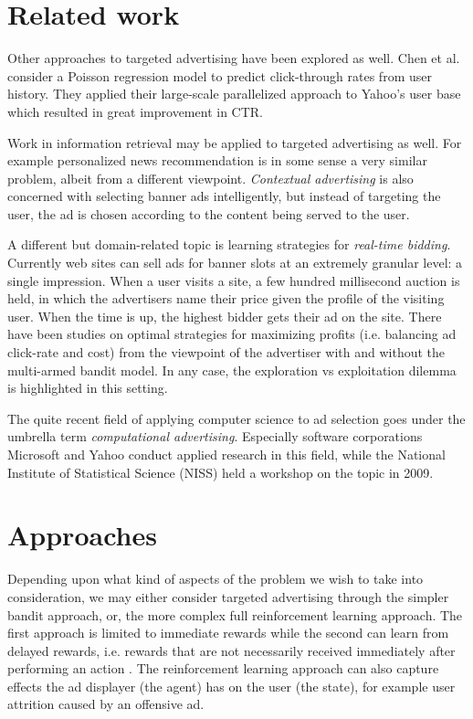 \documentclass{article} %
\begin{document}
\section{Related work}

Other approaches to targeted advertising have been explored as well. Chen et
al. \cite{chen2009large} consider a Poisson regression model to predict
click-through rates from user history.  They applied their large-scale
parallelized approach to Yahoo's user base which resulted in great improvement
in CTR.

Work in information retrieval may be applied to targeted advertising as well.
For example personalized news recommendation is in some sense a very similar
problem, albeit from a different viewpoint. \emph{Contextual advertising} is
also concerned with selecting banner ads intelligently, but instead of
targeting the user, the ad is chosen according to the content being served to
the user.

A different but domain-related topic is learning strategies for
\emph{real-time bidding}. Currently web sites can sell ads for banner slots at
an extremely granular level: a single impression. When a user visits a site, a
few hundred millisecond auction is held, in which the advertisers name their
price given the profile of the visiting user. When the time is up, the highest
bidder gets their ad on the site. There have been studies on optimal strategies
for maximizing profits (i.e. balancing ad click-rate and cost) from the
viewpoint of the advertiser with \cite{ding2013multi} and without
\cite{chakraborty2010selective} the multi-armed bandit model. In any case, the
exploration vs exploitation dilemma is highlighted in this setting.

The quite recent field of applying computer science to ad selection goes under
the umbrella term \emph{computational advertising}. Especially software
corporations Microsoft and Yahoo conduct applied research in this field, while
the National Institute of Statistical Science (NISS) held a workshop on the
topic in 2009. %

\section{Approaches}

Depending upon what kind of aspects of the problem we wish to take into
consideration, we may either consider targeted advertising through the simpler
bandit approach, or, the more complex full reinforcement learning approach. The
first approach is limited to immediate rewards while the second can learn from
delayed rewards, i.e. rewards that are not necessarily received immediately
after performing an action \cite{silver2013concurrent}. The reinforcement
learning approach can also capture effects the ad displayer (the agent) has
on the user (the state), for example user attrition caused by an offensive ad.
\end{document}

